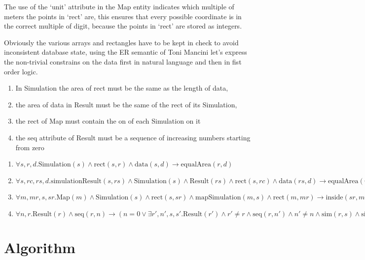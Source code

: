 \documentclass[Lau]{sapthesis} %
\let\oldsection\section
\def\subsection{\oldsection}
\def\section{\chapter}
\begin{document}
The use of the `unit' attribute in the Map entity indicates which multiple of
meters the points in `rect' are, this ensures that every possible coordinate is
in the correct multiple of digit, because the points in `rect' are stored as
integers.

Obviously the various arrays and rectangles have to be kept in check to avoid
inconsistent database state, using the ER semantic of Toni Mancini \cite{bd2}
let's express the non-trivial constrains on the data first in natural language
and then in fist order logic.

\begin{enumerate}
\item In Simulation the area of rect must be the same as the length of data,
\item the area of data in Result must be the same of the rect of its Simulation,
\item the rect of Map must contain the on of each Simulation on it
\item the seq attribute of Result must be a sequence of increasing numbers
starting from zero
\end{enumerate}

\begin{enumerate}
\item $\forall s,r,d.\textrm{Simulation}(s)
	\land \textrm{rect}(s,r)
	\land \textrm{data}(s,d)
	\rightarrow \textrm{equalArea}(r,d)$
\item $\forall s,rc,rs,d.\textrm{simulationResult}(s,rs) \allowbreak
	\land \textrm{Simulation}(s) \allowbreak
	\land \textrm{Result}(rs) \allowbreak
	\land \textrm{rect}(s,rc) \allowbreak
	\land \textrm{data}(rs,d) \allowbreak
	\rightarrow\textrm{equalArea}(rc,d)$
\item $\forall m,mr,s,sr. \textrm{Map}(m)
	\land \textrm{Simulation}(s) \allowbreak
	\land \textrm{rect}(s,sr) \allowbreak
	\land \textrm{mapSimulation}(m,s) \allowbreak
	\land \textrm{rect}(m,mr) \allowbreak
	\rightarrow \textrm{inside}(sr,mr)$
\item $\forall n,r.\textrm{Result}(r)
	\land\textrm{seq}(r,n)
	\rightarrow
	(n=0 \lor \exists r',n',s,s'.\textrm{Result}(r')
		\land r'\neq r
		\land \textrm{seq}(r,n')
		\land n'\neq n
		\land \textrm{sim}(r,s)
		\land \textrm{sim}(r',s')
		\land s'=s\rightarrow n'=n-1)$
\end{enumerate}

\subsection{Algorithm}
\end{document}

